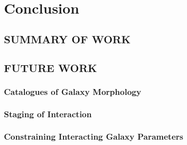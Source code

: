 \chapter{Conclusion}
\section{SUMMARY OF WORK}
\section{FUTURE WORK}
\subsection{Catalogues of Galaxy Morphology}
\subsection{Staging of Interaction}
\subsection{Constraining Interacting Galaxy Parameters}